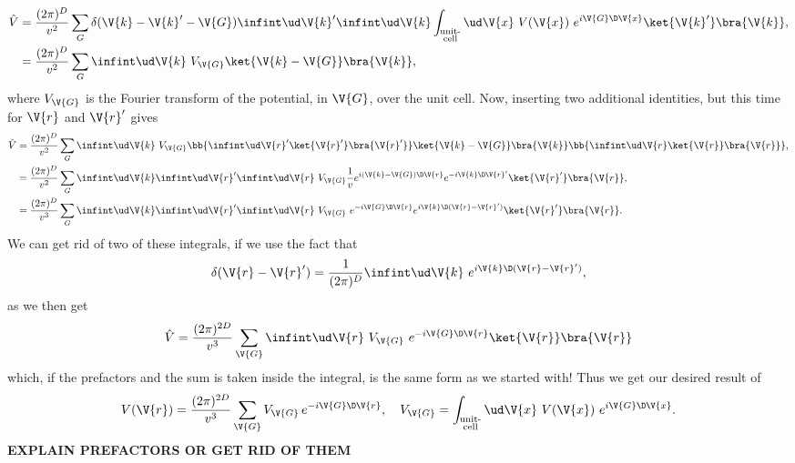 \documentclass[main.tex]{subfiles}
\begin{document}
	\begin{align}\label{key}
		\hat{V} &= \frac{(2\pi)^D}{v^2} \sum_{G} \delta(\V{k}-\V{k}'-\V{G}) \infint \ud \V{k}' \infint \ud \V{k} \int_{\substack{\text{unit-} \\\text{cell}}} \ud \V{x}\ V(\V{x})\  e^{i \V{G} \D \V{x}} \ket{\V{k}'} \bra{\V{k}}, \\
		&= \frac{(2\pi)^D}{v^2} \sum_{G} \infint \ud \V{k}\ V_{\V{G}} \ket{\V{k}-\V{G}} \bra{\V{k}},
	\end{align}
	where $ V_{\V{G}} $ is the Fourier transform of the potential, in $ \V{G} $, over the unit cell. Now, inserting two additional identities, but this time for $ \V{r} $ and $ \V{r}' $ gives
	\begin{align}\label{key}
		\hat{V} &= \frac{(2\pi)^D}{v^2} \sum_{G} \infint \ud \V{k} \ V_{\V{G}} \bb{\infint \ud \V{r}' \ket{\V{r}'} \bra{\V{r}'}} \ket{\V{k}-\V{G}} \bra{\V{k}} \bb{\infint \ud \V{r} \ket{\V{r}} \bra{\V{r}} }, \\
		&= \frac{(2\pi)^D}{v^2} \sum_{G} \infint \ud \V{k} \infint \ud \V{r}' \infint \ud \V{r} \   V_{\V{G}} \frac{1}{v} e^{i (\V{k}-\V{G}) \D \V{r}} e^{-i \V{k} \D \V{r}'} \ket{\V{r}'} \bra{\V{r}}, \\
		&= \frac{(2\pi)^D}{v^3} \sum_{G} \infint \ud \V{k} \infint \ud \V{r}' \infint \ud \V{r} \  V_{\V{G}} \  e^{-i \V{G} \D \V{r}} e^{i \V{k} \D (\V{r}-\V{r}')} \ket{\V{r}'} \bra{\V{r}}.
	\end{align}
	We can get rid of two of these integrals, if we use the fact that
	\begin{equation}\label{key}
		\delta(\V{r}-\V{r}') = \frac{1}{(2\pi)^D} \infint \ud \V{k}\  e^{i \V{k} \D (\V{r}-\V{r}')},
	\end{equation}
	as we then get
	\begin{equation}\label{key}
		\hat{V} = \frac{(2\pi)^{2D}}{v^3} \sum_{\V{G}} \infint \ud \V{r} \ V_{\V{G}}\ e^{-i \V{G} \D \V{r}} \ket{\V{r}} \bra{\V{r}}
	\end{equation}
	which, if the prefactors and the sum is taken inside the integral, is the same form as we started with! Thus we get our desired result of
	\begin{equation}\label{key}
		V(\V{r}) =  \frac{(2\pi)^{2D}}{v^3} \sum_{\V{G}} V_{\V{G}} \,e^{-i \V{G} \D \V{r}}, \quad V_{\V{G}} = \int_{\substack{\text{unit-} \\\text{cell}}} \ud \V{x}\ V(\V{x})\  e^{i \V{G} \D \V{x}}.
	\end{equation}
	\textbf{EXPLAIN PREFACTORS OR GET RID OF THEM}
	
\end{document}
